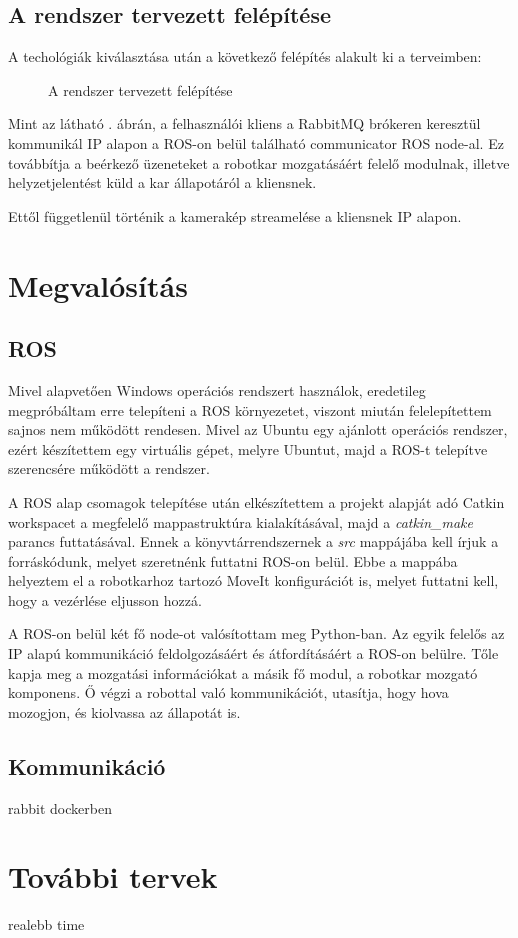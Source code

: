 \documentclass[11pt,a4paper,oneside]{article}
\newcommand{\afigref}[1]{\aref{fig:#1}.}
\newcommand{\insertfig}[4]{
	\vspace*{2mm}
	\begin{figure}[#4]
		\center
		\resizebox{#3}{!}{\texttt{[image: images/\#1]}}
		\parbox{0.8\textwidth}{\vspace*{4mm}\caption{{#2}}\small\label{fig:#1}}
	\end{figure}
	\vspace*{-2\parskip}
}
\begin{document}
\subsection{A rendszer tervezett felépítése}

A techológiák kiválasztása után a következő felépítés alakult ki a terveimben:

\insertfig{felepites}{A rendszer tervezett felépítése}{12cm}{h!}

Mint az látható \afigref{felepites} ábrán, a felhasználói kliens a RabbitMQ brókeren keresztül kommunikál IP alapon a ROS-on belül található communicator ROS node-al. Ez továbbítja a beérkező üzeneteket a robotkar mozgatásáért felelő modulnak, illetve helyzetjelentést küld a kar állapotáról a kliensnek.

Ettől függetlenül történik a kamerakép streamelése a kliensnek IP alapon.

\newpage
\section{Megvalósítás}

\subsection{ROS}

Mivel alapvetően Windows operációs rendszert használok, eredetileg megpróbáltam erre telepíteni a ROS környezetet, viszont miután felelepítettem sajnos nem működött rendesen. Mivel az Ubuntu egy ajánlott operációs rendszer, ezért készítettem egy virtuális gépet, melyre Ubuntut, majd a ROS-t telepítve szerencsére működött a rendszer.

A ROS alap csomagok telepítése után elkészítettem a projekt alapját adó Catkin workspacet a megfelelő mappastruktúra kialakításával, majd a \textit{catkin\_make} parancs futtatásával. Ennek a könyvtárrendszernek a \textit{src} mappájába kell írjuk a forráskódunk, melyet szeretnénk futtatni ROS-on belül. Ebbe a mappába helyeztem el a robotkarhoz tartozó MoveIt konfigurációt is, melyet futtatni kell, hogy a vezérlése eljusson hozzá.

A ROS-on belül két fő node-ot valósítottam meg Python-ban. Az egyik felelős az IP alapú kommunikáció feldolgozásáért és átfordításáért a ROS-on belülre. Tőle kapja meg a mozgatási információkat a másik fő modul, a robotkar mozgató komponens. Ő végzi a robottal való kommunikációt, utasítja, hogy hova mozogjon, és kiolvassa az állapotát is.

\subsection{Kommunikáció}


rabbit dockerben

\newpage
\section{További tervek}

realebb time
\end{document}
